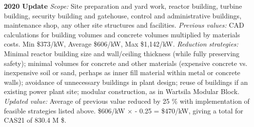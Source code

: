  \textbf{2020 Update} 
\emph{Scope: } 
Site preparation and yard work, reactor building, turbine building, security building and gatehouse, control and administrative buildings, maintenance shop, any other site structures and facilities. 
 \emph{Previous values:} CAD calculations for building volumes and concrete volumes multiplied by materials costs. 
Min \$373/kW, Average \$606/kW, Max \$1,142/kW. 
\emph{Reduction strategies: } 
Minimal reactor building size and wall/ceiling thickness (while fully preserving safety); minimal volumes for concrete and other materials (expensive concrete vs. inexpensive soil or sand, perhaps as inner fill material within metal or concrete walls); avoidance of unnecessary buildings in plant design; reuse of buildings if an existing power plant site; modular construction, as in Wartsila Modular Block. 
\emph{Updated value: } 
Average of previous value reduced by 25 \% with implementation of feasible strategies listed above. \$606/kW $\times$ - 0.25 = \$470/kW, giving a total for CAS21 of 830.4 M \$. 

